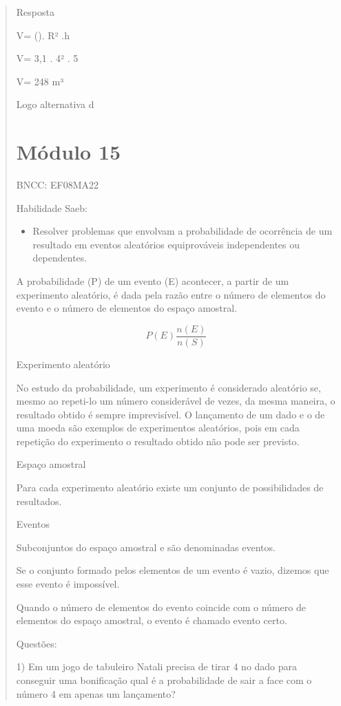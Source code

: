 \begin{quote}
\begin{escolha}
Resposta

V= (\Pi). R² .h

V= 3,1 . 4² . 5

V= 248 m³

Logo alternativa d

\chapter{Módulo 15}

BNCC: EF08MA22

Habilidade Saeb:

\begin{itemize}
\tightlist
\item
  Resolver problemas que envolvam a probabilidade de ocorrência de um
  resultado em eventos aleatórios equiprováveis independentes ou
  dependentes.
\end{itemize}

A probabilidade (P) de um evento (E) acontecer, a partir de um
experimento aleatório, é dada pela razão entre o número de elementos do
evento e o número de elementos do espaço amostral.

\[P(E)\frac{n(E)}{n(S)}\]

Experimento aleatório

No estudo da probabilidade, um experimento é considerado aleatório se,
mesmo ao repeti-lo um número considerável de vezes, da mesma maneira, o
resultado obtido é sempre imprevisível. O lançamento de um dado e o de
uma moeda são exemplos de experimentos aleatórios, pois em cada
repetição do experimento o resultado obtido não pode ser previsto.

Espaço amostral

Para cada experimento aleatório existe um conjunto de possibilidades de
resultados.

Eventos

Subconjuntos do espaço amostral e são denominadas eventos.

Se o conjunto formado pelos elementos de um evento é vazio, dizemos que
esse evento é impossível.

Quando o número de elementos do evento coincide com o número de
elementos do espaço amostral, o evento é chamado evento certo.

Questões:

1) Em um jogo de tabuleiro Natali precisa de tirar 4 no dado para
conseguir uma bonificação qual é a probabilidade de sair a face com o
número 4 em apenas um lançamento?


\end{escolha}
\end{quote}
